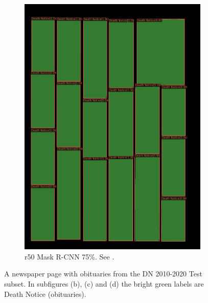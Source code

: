 \documentclass[oneside, english, bibtex]{kththesis}
\begin{document}
\begin{figure}[!htb]
\begin{adjustbox}{center,max size={\textwidth}{0.9\textheight}}
{\begin{subfigure}{0.6\textwidth}
\includegraphics[width=\linewidth]{figures/labels-vanilla-0.75/GQU6vjW.jpg}
  \caption{r50 Mask R-CNN 75\%. See . }
  \label{fig:GQU6vjW_pred}
\end{subfigure}}
\end{adjustbox}
  \caption{A newspaper page with obituaries from the DN 2010-2020 Test subset. In subfigures (b), (c) and (d) the bright green labels are Death Notice (obituaries).}
\label{fig:GQU6vjW}
\end{figure}


\clearpage
\end{document}
